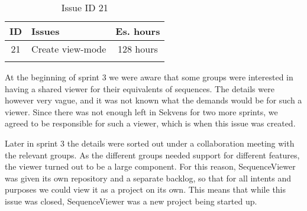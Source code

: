 \begin{longtable} { | c | p{12cm} | c | } 
\hline
	ID 	&	Issues	&		 Es. hours \\\hline
	21 	&	Create view-mode	&	128 hours \\\hline
\caption{Issue ID 21}
\label{tab:spr3_viewmodecreated}
\end{longtable}

At the beginning of sprint 3 we were aware that some groups were interested in having a shared viewer for their equivalents of sequences. The details were however very vague, and it was not known what the demands would be for such a viewer. Since there was not enough left in Sekvens for two more sprints, we agreed to be responsible for such a viewer, which is when this issue was created.

Later in sprint 3 the details were sorted out under a collaboration meeting with the relevant groups. As the different groups needed support for different features, the viewer turned out to be a large component. For this reason, SequenceViewer was given its own repository and a separate backlog, so that for all intents and purposes we could view it as a project on its own. This means that while this issue was closed, SequenceViewer was a new project being started up. 